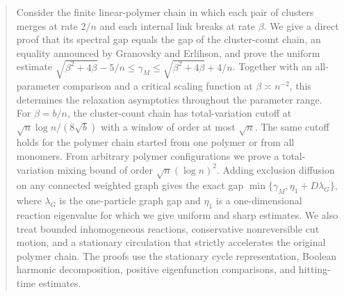 \begin{abstract}
Consider the finite linear-polymer chain in which each pair of clusters
merges at rate $2/n$ and each internal link breaks at rate $\beta$.
We give a direct proof that its spectral gap equals the gap of the
cluster-count chain, an equality announced by Granovsky and Erlihson, and prove
the uniform estimate
$\sqrt{\beta^2+4\beta}-5/n\le\gamma_M\le
\sqrt{\beta^2+4\beta}+4/n$.
Together with an all-parameter comparison and a critical scaling
function at $\beta\asymp n^{-2}$, this determines the relaxation
asymptotics throughout the parameter range. For $\beta=b/n$, the
cluster-count chain has total-variation cutoff at
$\sqrt n\log n/(8\sqrt b)$ with a window of order at most $\sqrt n$.
The same cutoff holds for the polymer chain started from one polymer
or from all monomers. From arbitrary polymer configurations we prove
a total-variation mixing bound of order $\sqrt n(\log n)^2$.
Adding exclusion diffusion on any connected
weighted graph gives the exact gap
$\min\{\gamma_M,\eta_1+D\lambda_G\}$, where $\lambda_G$ is the
one-particle graph gap and $\eta_1$ is a one-dimensional reaction
eigenvalue for which we give uniform and sharp estimates.
We also treat bounded inhomogeneous reactions, conservative
nonreversible cut motion, and a stationary circulation that strictly
accelerates the original polymer chain. The proofs use the stationary
cycle representation, Boolean harmonic decomposition, positive
eigenfunction comparisons, and hitting-time estimates.
\end{abstract}
